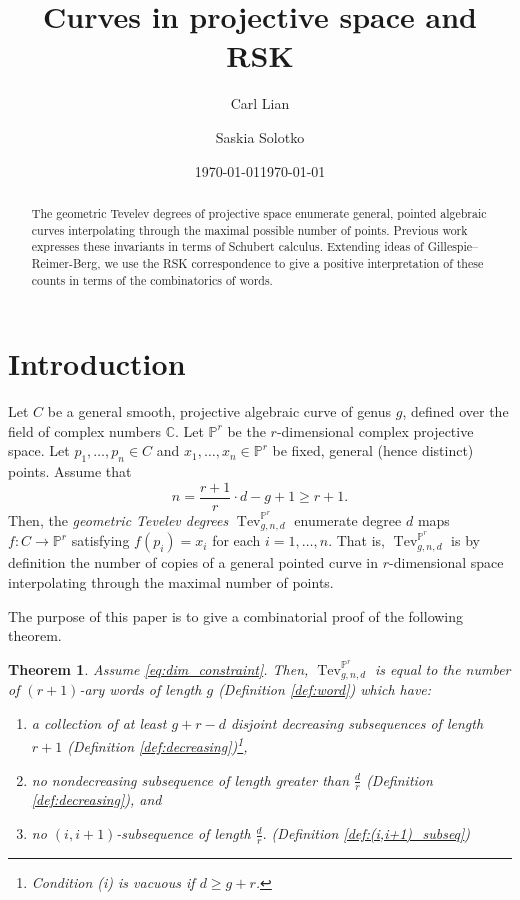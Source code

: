 \documentclass[12pt]{amsart}
\title{Curves in projective space and RSK}
\author{Carl Lian}
\author{Saskia Solotko}
\date{\today}
\def\bC{\mathbb{C}}
\def\bP{\mathbb{P}}
\DeclareMathOperator{\Tev}{Tev}
\newtheorem{theorem}[definition]{Theorem}
\begin{document}
\begin{abstract}
    The geometric Tevelev degrees of projective space enumerate general, pointed algebraic curves interpolating through the maximal possible number of points. Previous work expresses these invariants in terms of Schubert calculus. Extending ideas of Gillespie--Reimer-Berg, we use the RSK correspondence to give a positive interpretation of these counts in terms of the combinatorics of words.
\end{abstract}

\maketitle

\date{\today}

\setcounter{tocdepth}{1}

\tableofcontents
\section{Introduction}\label{sec:intro}

Let $C$ be a general smooth, projective algebraic curve of genus $g$, defined over the field of complex numbers $\bC$. Let $\bP^r$ be the $r$-dimensional complex projective space. Let $p_1,\ldots,p_n\in C$ and $x_1,\ldots,x_n\in \bP^r$ be fixed, general (hence distinct) points. Assume that
\begin{equation}\label{eq:dim_constraint}
    n=\frac{r+1}{r}\cdot d-g+1\ge r+1.
\end{equation}
Then, the \emph{geometric Tevelev degrees} $\Tev^{\bP^r}_{g,n,d}$ enumerate degree $d$ maps $f:C\to\bP^r$ satisfying $f(p_i)=x_i$ for each $i=1,\ldots,n$. That is, $\Tev^{\bP^r}_{g,n,d}$ is by definition the number of copies of a general pointed curve in $r$-dimensional space interpolating through the maximal number of points.

The purpose of this paper is to give a combinatorial proof of the following theorem.

\begin{theorem}\label{thm:main_intro}
Assume \eqref{eq:dim_constraint}. Then, $\Tev^{\bP^r}_{g,n,d}$ is equal to the number of $(r+1)$-ary words of length $g$ (Definition \ref{def:word}) which have:
\begin{enumerate}
\item a collection of at least $g+r-d$ disjoint decreasing subsequences of length $r+1$ (Definition \ref{def:decreasing})\footnote{Condition (i) is vacuous if $d\ge g+r$.},
\item no nondecreasing subsequence of length greater than $\frac{d}{r}$ (Definition \ref{def:decreasing}), and
\item no $(i,i+1)$-subsequence of length $\frac{d}{r}.$ (Definition \ref{def:(i,i+1)_subseq})
\end{enumerate}
\end{theorem}
\end{document}
